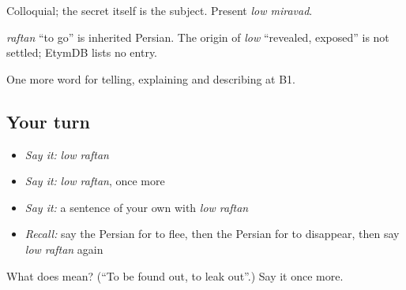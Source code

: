 Colloquial; the secret itself is the subject. Present \emph{low miravad}.

\begin{cousinweb}
\emph{raftan} \textquotedblleft{}to go\textquotedblright{} is inherited Persian. The origin of \emph{low} \textquotedblleft{}revealed, exposed\textquotedblright{} is not settled; EtymDB lists no entry.
\end{cousinweb}

\begin{grammarlens}[title={What you've built}]
One more word for telling, explaining and describing at B1.
\end{grammarlens}

\subsection*{Your turn}
\begin{itemize}
\raggedright
  \item \emph{Say it:} \emph{low raftan}
  \item \emph{Say it:} \emph{low raftan}, once more
  \item \emph{Say it:} a sentence of your own with \emph{low raftan}
  \item \emph{Recall:} say the Persian for to flee, then the Persian for to disappear, then say \emph{low raftan} again
\end{itemize}

\begin{tcolorbox}[breakable,colback=teal!4,colframe=teal!35!black,title={Before you move on}]
What does   mean? (\textquotedblleft{}To be found out, to leak out\textquotedblright{}.) Say it once more.
\end{tcolorbox}
